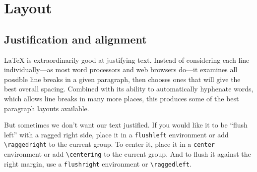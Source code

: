 \chapter{Layout}

\section{Justification and alignment}

\LaTeX{} is extraordinarily good at justifying text.
Instead of considering each line individually---as most word processors and
web browsers do---it examines all possible line breaks in a given paragraph,
then chooses ones that will give the best overall
spacing.\punckern{}
Combined with its ability to automatically hyphenate words,
which allows line breaks in many more places,\punckern{}
this produces some of the best paragraph layouts available.

But sometimes we don't want our text justified.
If you would like it to be ``flush left''
with a ragged right side, place it in a \texttt{flushleft} environment
or add \verb|\raggedright| to the current group.
To center it, place it in a
\texttt{center} environment or add \verb|\centering| to the current group.
And to flush it against the right margin,
use a \texttt{flushright} environment or \verb|\raggedleft|.

